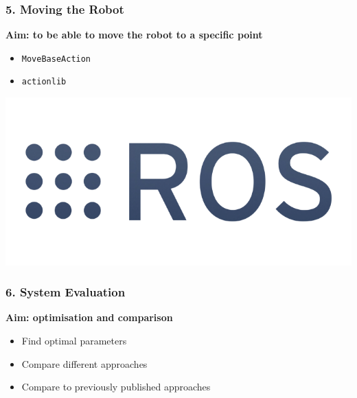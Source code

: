 \begin{frame}[c] \frametitle{5. Moving the Robot}

	\textbf{Aim: to be able to move the robot to a specific point}

	\bigskip

		\begin{itemize}\itemsep10pt
			\item \texttt{MoveBaseAction}
			\item \texttt{actionlib}
		\end{itemize}

	\vfill

	\includegraphics[width=0.8\linewidth]{src/ros.png}

	\vfill

\end{frame}


\begin{frame}[c] \frametitle{6. System Evaluation}

	\textbf{Aim: optimisation and comparison}

	\begin{itemize}\itemsep10pt
		\item Find optimal parameters
		\item Compare different approaches
		\item Compare to previously published approaches
	\end{itemize}

\end{frame}
